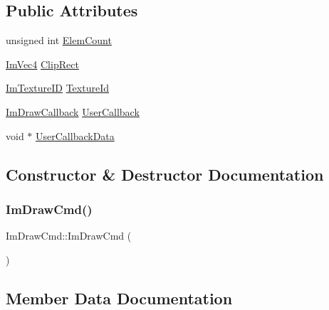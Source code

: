 \subsection*{Public Attributes}
\begin{DoxyCompactItemize}
\item 
unsigned int \mbox{\hyperlink{struct_im_draw_cmd_aafe2532964fb1f6905d67d84dd3e8730}{Elem\+Count}}
\item 
\mbox{\hyperlink{struct_im_vec4}{Im\+Vec4}} \mbox{\hyperlink{struct_im_draw_cmd_a838918f420ff81cb8dc7265077592daa}{Clip\+Rect}}
\item 
\mbox{\hyperlink{imgui_8h_a364f4447ecbc4ca176145ccff9db6286}{Im\+Texture\+ID}} \mbox{\hyperlink{struct_im_draw_cmd_a4f3b5985ece9ca6b71e7a8e7d85a82e5}{Texture\+Id}}
\item 
\mbox{\hyperlink{imgui_8h_a232a477233f9e3ab7640720bf94674de}{Im\+Draw\+Callback}} \mbox{\hyperlink{struct_im_draw_cmd_ad26dac4e939f5c4bb892cbca0f9e3af8}{User\+Callback}}
\item 
void $\ast$ \mbox{\hyperlink{struct_im_draw_cmd_ae2f5a0baf4a0b25942237b8ce6adb42d}{User\+Callback\+Data}}
\end{DoxyCompactItemize}


\subsection{Constructor \& Destructor Documentation}
\mbox{\label{struct_im_draw_cmd_adcf30cacb8e6b747e90000603c87f1e3}} 
\subsubsection{\texorpdfstring{Im\+Draw\+Cmd()}{ImDrawCmd()}}
{\footnotesize\ttfamily Im\+Draw\+Cmd\+::\+Im\+Draw\+Cmd (\begin{DoxyParamCaption}{ }\end{DoxyParamCaption})\hspace{0.3cm}{\ttfamily [inline]}}



\subsection{Member Data Documentation}
\mbox{\label{struct_im_draw_cmd_a838918f420ff81cb8dc7265077592daa}} 
